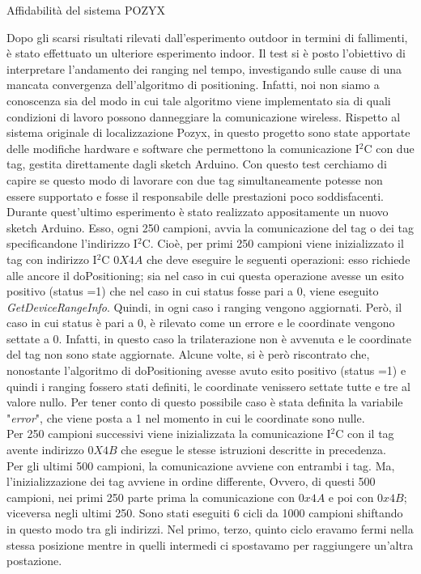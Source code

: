 \documentclass[12pt]{report}
\begin{document}
	\begin{section}{Affidabilità del sistema POZYX}

		Dopo gli scarsi risultati rilevati dall’esperimento outdoor in termini di fallimenti, è stato effettuato un ulteriore esperimento indoor. Il test si è posto l’obiettivo di interpretare l’andamento dei ranging nel tempo, investigando sulle cause di una mancata convergenza dell’algoritmo di positioning.
		Infatti, noi non siamo a conoscenza sia del modo in cui tale algoritmo viene implementato sia di quali condizioni di lavoro possono danneggiare la comunicazione wireless. 
		Rispetto al sistema originale di localizzazione Pozyx, in questo progetto sono state apportate delle modifiche hardware e software che permettono la comunicazione I$^2$C con due tag, gestita direttamente dagli sketch Arduino. Con questo test cerchiamo di capire se questo modo di lavorare con due tag 							simultaneamente potesse non essere supportato e fosse il responsabile delle prestazioni poco soddisfacenti.\\

		Durante quest’ultimo esperimento è stato realizzato appositamente un nuovo sketch Arduino. Esso, ogni 250 campioni, avvia la comunicazione del tag o  dei tag  specificandone l’indirizzo I$^2$C. Cioè, per  primi 250 campioni viene inizializzato il tag con indirizzo I$^2$C $0X4A$ che deve eseguire le seguenti 					operazioni: esso richiede alle ancore il doPositioning; sia nel caso in cui questa operazione avesse un esito positivo (status =1) che nel caso in cui status fosse pari a 0, viene eseguito \textit{GetDeviceRangeInfo}. Quindi, in ogni caso i ranging vengono aggiornati. Però, il caso in cui status è pari a 0, è rilevato come 		un errore e le coordinate vengono settate a 0. Infatti, in questo caso la trilaterazione non è avvenuta e le coordinate del tag non sono state aggiornate. Alcune volte, si è però riscontrato che, nonostante l’algoritmo di doPositioning avesse avuto esito positivo (status =1) e quindi i ranging fossero stati definiti, le 				coordinate venissero settate tutte e tre al valore nullo. Per tener conto di questo possibile caso è stata definita la variabile "\textit{error}", che viene posta a 1 nel momento in cui le coordinate sono nulle.\\ 
		Per 250 campioni successivi viene inizializzata la comunicazione I$^2$C con il tag avente indirizzo $0X4B$ che esegue le stesse istruzioni descritte in precedenza.\\
		Per gli ultimi 500 campioni, la comunicazione avviene con entrambi i tag. Ma, l’inizializzazione dei tag avviene in ordine differente, Ovvero, di questi 500 campioni, nei primi 250 parte prima la comunicazione con $0x4A$ e poi con $0x4B$; viceversa negli ultimi 250. 
		Sono stati eseguiti 6 cicli da 1000 campioni shiftando in questo modo tra gli indirizzi.
		Nel primo, terzo, quinto ciclo eravamo fermi nella stessa posizione mentre in quelli intermedi ci spostavamo per raggiungere un’altra postazione.\\


\end{section}
\end{document}
